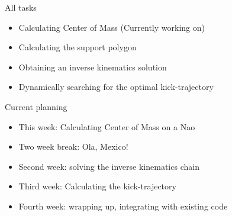\documentclass{beamer}
\begin{document}
\begin{frame}{All tasks}
    \begin{itemize}
        \item{Calculating Center of Mass (Currently working on)}
        \item{Calculating the support polygon}
        \item{Obtaining an inverse kinematics solution}
        \item{Dynamically searching for the optimal kick-trajectory}
    \end{itemize}
\end{frame}

\begin{frame}{Current planning}
    \begin{itemize}
    \item{This week: Calculating Center of Mass on a Nao}
    \item{Two week break: Ola, Mexico!}
    \item{Second week: solving the inverse kinematics chain}
    \item{Third week: Calculating the kick-trajectory}
    \item{Fourth week: wrapping up, integrating with existing code} 
    \end{itemize}
\end{frame}
\end{document}
